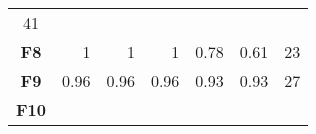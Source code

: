 \documentclass[12pt,a4paper]{article}
\begin{document}
\begin{longtable}[c]{@{}crrrrrr@{}}
\begin{minipage}[t]{0.07\columnwidth}
41
\strut\end{minipage}\tabularnewline
\begin{minipage}[t]{0.11\columnwidth}\centering\strut
\textbf{F8}
\strut\end{minipage} &
\begin{minipage}[t]{0.07\columnwidth}\raggedleft\strut
1
\strut\end{minipage} &
\begin{minipage}[t]{0.08\columnwidth}\raggedleft\strut
1
\strut\end{minipage} &
\begin{minipage}[t]{0.09\columnwidth}\raggedleft\strut
1
\strut\end{minipage} &
\begin{minipage}[t]{0.10\columnwidth}\raggedleft\strut
0.78
\strut\end{minipage} &
\begin{minipage}[t]{0.11\columnwidth}\raggedleft\strut
0.61
\strut\end{minipage} &
\begin{minipage}[t]{0.07\columnwidth}\raggedleft\strut
23
\strut\end{minipage}\tabularnewline
\begin{minipage}[t]{0.11\columnwidth}\centering\strut
\textbf{F9}
\strut\end{minipage} &
\begin{minipage}[t]{0.07\columnwidth}\raggedleft\strut
0.96
\strut\end{minipage} &
\begin{minipage}[t]{0.08\columnwidth}\raggedleft\strut
0.96
\strut\end{minipage} &
\begin{minipage}[t]{0.09\columnwidth}\raggedleft\strut
0.96
\strut\end{minipage} &
\begin{minipage}[t]{0.10\columnwidth}\raggedleft\strut
0.93
\strut\end{minipage} &
\begin{minipage}[t]{0.11\columnwidth}\raggedleft\strut
0.93
\strut\end{minipage} &
\begin{minipage}[t]{0.07\columnwidth}\raggedleft\strut
27
\strut\end{minipage}\tabularnewline
\begin{minipage}[t]{0.11\columnwidth}\centering\strut
\textbf{F10}
\strut\end{minipage} &
\begin{minipage}[t]{0.07\columnwidth}\raggedleft\strut

\end{minipage}
\end{longtable}
\end{document}
